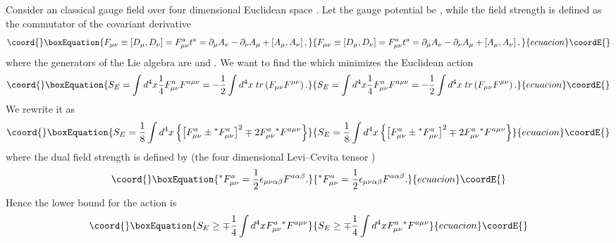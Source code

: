 \documentclass[a4paper,12pt]{book}
\begin{document}
Consider an \coordHE{} classical gauge field over four dimensional
Euclidean space \coordHE{}. Let the gauge potential be \coordHE{}, while the field strength is defined as the commutator of the
covariant derivative \coordHE{}%
\begin{equation}\coord{}\boxEquation{
F_{\mu \nu }\equiv \left[ D_{\mu },D_{\nu }\right] =F_{\mu \nu
}^{a}t^{a}=\partial _{\mu }A_{\nu }-\partial _{\nu }A_{\mu }+\left[ A_{\mu
},A_{\nu }\right] ,
}{
F_{\mu \nu }\equiv \left[ D_{\mu },D_{\nu }\right] =F_{\mu \nu
}^{a}t^{a}=\partial _{\mu }A_{\nu }-\partial _{\nu }A_{\mu }+\left[ A_{\mu
},A_{\nu }\right] ,
}{ecuacion}\coordE{}\end{equation}
where the generators of the Lie algebra are \coordHE{}
and \coordHE{}. We want to find the \coordHE{} which minimizes the Euclidean action 
\begin{equation}\coord{}\boxEquation{
S_{E}=\int d^{4}x\frac{1}{4}F_{\mu \nu }^{a}F^{a\mu \nu }=-\frac{1}{2}\int
d^{4}x\;tr\left( F_{\mu \nu }F^{\mu \nu }\right) .
}{
S_{E}=\int d^{4}x\frac{1}{4}F_{\mu \nu }^{a}F^{a\mu \nu }=-\frac{1}{2}\int
d^{4}x\;tr\left( F_{\mu \nu }F^{\mu \nu }\right) .
}{ecuacion}\coordE{}\end{equation}
We rewrite it as 
\begin{equation}\coord{}\boxEquation{
S_{E}=\frac{1}{8}\int d^{4}x\left\{ \left[ F_{\mu \nu }^{a}\pm {}^{*}F_{\mu
\nu }^{a}\right] ^{2}\mp 2F_{\mu \nu }^{a}{}^{*}F^{a\mu \nu }\right\}
\label{bogo4}
}{
S_{E}=\frac{1}{8}\int d^{4}x\left\{ \left[ F_{\mu \nu }^{a}\pm {}^{*}F_{\mu
\nu }^{a}\right] ^{2}\mp 2F_{\mu \nu }^{a}{}^{*}F^{a\mu \nu }\right\}
}{ecuacion}\coordE{}\end{equation}
where the dual field strength \coordHE{} is defined by (the four dimensional
Levi--Cevita tensor \coordHE{}) 
\begin{equation}\coord{}\boxEquation{
^{\ast }F_{\mu \nu }^{a}=\frac{1}{2}\epsilon _{\mu \nu \alpha \beta
}F^{a\alpha \beta }.
}{
^{\ast }F_{\mu \nu }^{a}=\frac{1}{2}\epsilon _{\mu \nu \alpha \beta
}F^{a\alpha \beta }.
}{ecuacion}\coordE{}\end{equation}
Hence the lower bound for the action is 
\begin{equation}\coord{}\boxEquation{
S_{E}\geq \mp \frac{1}{4}\int d^{4}xF_{\mu \nu }^{a}{}^{*}F^{a\mu \nu }
\label{lowbou}
}{
S_{E}\geq \mp \frac{1}{4}\int d^{4}xF_{\mu \nu }^{a}{}^{*}F^{a\mu \nu }
}{ecuacion}\coordE{}\end{equation}
\end{document}
